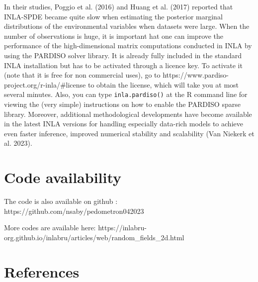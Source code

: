 \documentclass[
  a4paper,
]{article}
\begin{document}
In their studies, Poggio et al. (2016) and Huang et al. (2017) reported
that INLA-SPDE became quite slow when estimating the posterior marginal
distributions of the environmental variables when datasets were large.
When the number of observations is huge, it is important hat one can
improve the performance of the high-dimensional matrix computations
conducted in INLA by using the PARDISO solver library. It is already
fully included in the standard INLA installation but has to be activated
through a licence key. To activate it (note that it is free for non
commercial uses), go to https://www.pardiso-project.org/r-inla/\#license
to obtain the license, which will take you at most several minutes.
Also, you can type \texttt{inla.pardiso()} at the R command line for
viewing the (very simple) instructions on how to enable the PARDISO
sparse library. Moreover, additional methodological developments have
become available in the latest INLA versions for handling especially
data-rich models to achieve even faster inference, improved numerical
stability and scalability (Van Niekerk et al. 2023).

\hypertarget{code-availability}{%
\section{Code availability}\label{code-availability}}

The code is also available on github :
https://github.com/nsaby/pedometron042023

More codes are available here:
https://inlabru-org.github.io/inlabru/articles/web/random\_fields\_2d.html

\hypertarget{references}{%
\section{References}\label{references}}
\end{document}
